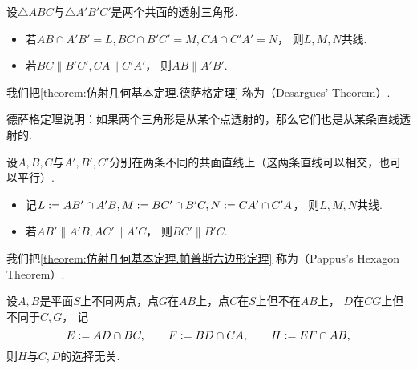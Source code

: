 \begin{theorem}\label{theorem:仿射几何基本定理.德萨格定理}
设\(\triangle ABC\)与\(\triangle A'B'C'\)是两个共面的透射三角形.
\begin{itemize}
	\item 若\(
		AB \cap A'B' = L,
		BC \cap B'C' = M,
		CA \cap C'A' = N
	\)，
	则\(L,M,N\)共线.

	\item 若\(
		BC \parallel B'C',
		CA \parallel C'A'
	\)，
	则\(AB \parallel A'B'\).
\end{itemize}
\end{theorem}

我们把\cref{theorem:仿射几何基本定理.德萨格定理}
称为（Desargues' Theorem）.

德萨格定理说明：如果两个三角形是从某个点透射的，那么它们也是从某条直线透射的.

\begin{theorem}\label{theorem:仿射几何基本定理.帕普斯六边形定理}
设\(A,B,C\)与\(A',B',C'\)分别在两条不同的共面直线上（这两条直线可以相交，也可以平行）.
\begin{itemize}
	\item 记\(
		L := AB' \cap A'B,
		M := BC' \cap B'C,
		N := CA' \cap C'A
	\)，
	则\(L,M,N\)共线.

	\item 若\(
		AB' \parallel A'B,
		AC' \parallel A'C
	\)，
	则\(BC' \parallel B'C\).
\end{itemize}
\end{theorem}

我们把\cref{theorem:仿射几何基本定理.帕普斯六边形定理}
称为（Pappus's Hexagon Theorem）.

\begin{theorem}\label{theorem:仿射几何基本定理.帕普斯调和定理}
设\(A,B\)是平面\(S\)上不同两点，点\(G\)在\(AB\)上，点\(C\)在\(S\)上但不在\(AB\)上，
\(D\)在\(CG\)上但不同于\(C,G\)，
记\begin{equation*}
	E := AD \cap BC,
	\qquad
	F := BD \cap CA,
	\qquad
	H := EF \cap AB,
\end{equation*}
则\(H\)与\(C,D\)的选择无关.
\end{theorem}


